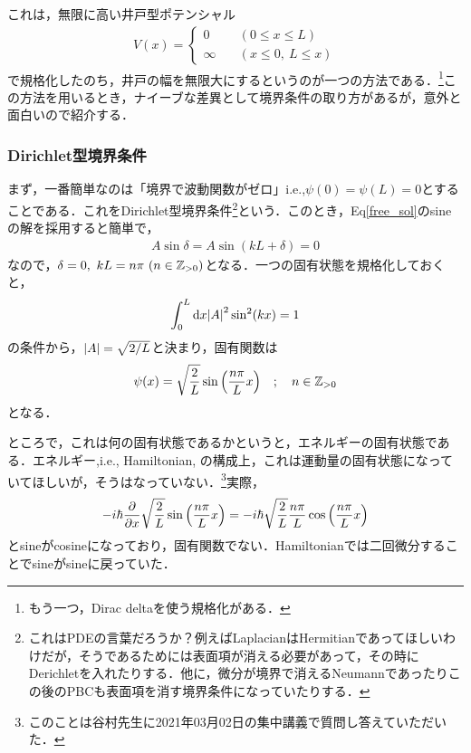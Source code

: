 これは，無限に高い井戸型ポテンシャル
\begin{align}
    V(x)=\begin{cases}
    0\quad&(0\leq x\leq L)\\
    \infty\quad&(x\leq0,\ L\leq x)
    \end{cases}
\end{align}
で規格化したのち，井戸の幅を無限大にするというのが一つの方法である．\footnote{もう一つ，Dirac deltaを使う規格化がある．}この方法を用いるとき，ナイーブな差異として境界条件の取り方があるが，意外と面白いので紹介する．
\subsubsection*{Dirichlet型境界条件}
まず，一番簡単なのは「境界で波動関数がゼロ」i.e.,$\psi(0)=\psi(L)=0$とすることである．これをDirichlet型境界条件\footnote{これはPDEの言葉だろうか？例えばLaplacianはHermitianであってほしいわけだが，そうであるためには表面項が消える必要があって，その時にDerichletを入れたりする．他に，微分が境界で消えるNeumannであったりこの後のPBCも表面項を消す境界条件になっていたりする．}という．このとき，Eq\eqref{free_sol}のsineの解を採用すると簡単で，
\begin{align}
    A\sin\delta=A\sin(kL+\delta)=0
\end{align}
なので，$\delta=0,\ kL=n\pi\  (n\in\Z_{>0})$となる．一つの固有状態を規格化しておくと，
\begin{align}
    \int_{0}^{L}\mathrm{d} x\abs{A}^2\sin^2(kx)=1
\end{align}
の条件から，$\abs{A}=\sqrt{2/L}$と決まり，固有関数は
\begin{align}
    \psi(x)=\sqrt{\frac{2}{L}}\sin\qty(\frac{n\pi}{L}x)\quad;\quad n\in\mathbb{Z}_{>0}
\end{align}
となる．

ところで，これは何の固有状態であるかというと，エネルギーの固有状態である．エネルギー,i.e., Hamiltonian, の構成上，これは運動量の固有状態になっていてほしいが，そうはなっていない．\footnote{このことは谷村先生に2021年03月02日の集中講義で質問し答えていただいた．}実際，
\begin{align}
    -i\hbar\pdv{}{x}\sqrt{\frac{2}{L}}\sin\qty(\frac{n\pi}{L}x)=-i\hbar\sqrt{\frac{2}{L}}\frac{n\pi}{L}\cos\qty(\frac{n\pi}{L}x)
\end{align}
とsineがcosineになっており，固有関数でない．Hamiltonianでは二回微分することでsineがsineに戻っていた．



